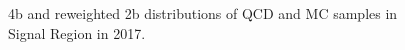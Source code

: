 \begin{figure}[ht]
 

    \caption{4b and reweighted 2b distributions of QCD and \ttbar MC samples in Signal Region in 2017.}
    \label{fig:data-weights-4b-SR-2017}
\end{figure}


